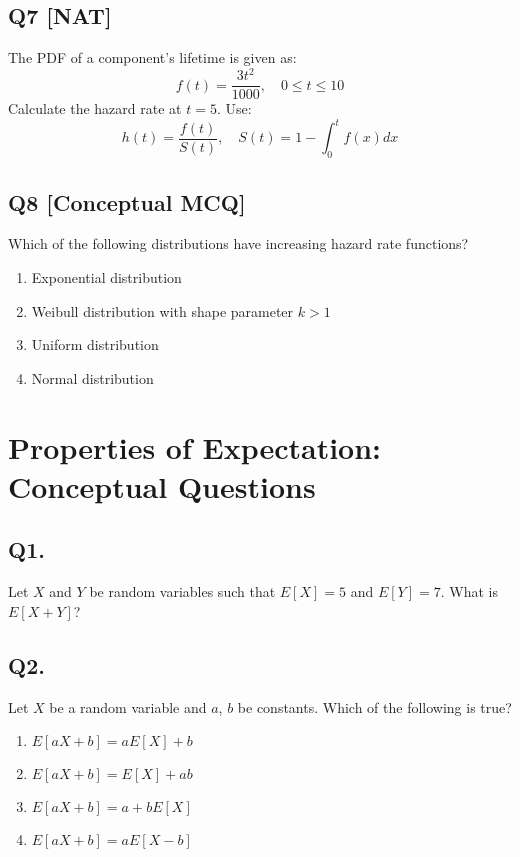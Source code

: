 \subsection*{Q7 [NAT]}
The PDF of a component's lifetime is given as:
\[
f(t) = \frac{3t^2}{1000}, \quad 0 \leq t \leq 10
\]
Calculate the hazard rate at $t = 5$. Use:
\[
h(t) = \frac{f(t)}{S(t)}, \quad S(t) = 1 - \int_0^t f(x) dx
\]

\subsection*{Q8 [Conceptual MCQ]}
Which of the following distributions have increasing hazard rate functions?

\begin{enumerate}[label=(\alph*)]
    \item Exponential distribution
    \item Weibull distribution with shape parameter $k > 1$
    \item Uniform distribution
    \item Normal distribution
\end{enumerate}

\section{Properties of Expectation: Conceptual Questions}

\subsection*{Q1.}
Let $X$ and $Y$ be random variables such that $E[X] = 5$ and $E[Y] = 7$. What is $E[X + Y]$?

\subsection*{Q2.}
Let $X$ be a random variable and $a$, $b$ be constants. Which of the following is true?
\begin{enumerate}[label=(\alph*)]
    \item $E[aX + b] = aE[X] + b$
    \item $E[aX + b] = E[X] + ab$
    \item $E[aX + b] = a + bE[X]$
    \item $E[aX + b] = aE[X - b]$
\end{enumerate}

